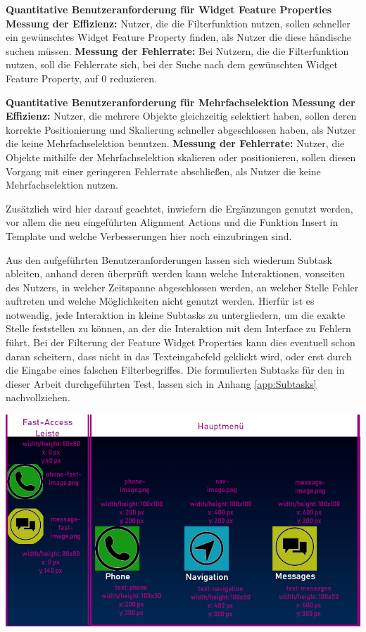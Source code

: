 \textbf{Quantitative Benutzeranforderung für Widget Feature Properties} \newline
\textbf{Messung der Effizienz:}
Nutzer, die die Filterfunktion nutzen, sollen schneller ein gewünschtes Widget Feature Property finden, als Nutzer die diese händische suchen müssen. \newline
\textbf{Messung der Fehlerrate:}
Bei Nutzern, die die Filterfunktion nutzen, soll die Fehlerrate sich, bei der Suche nach dem gewünschten Widget Feature Property, auf 0 reduzieren.

\textbf{Quantitative Benutzeranforderung für Mehrfachselektion}\newline
\textbf{Messung der Effizienz:}
Nutzer, die mehrere Objekte gleichzeitig selektiert haben, sollen deren korrekte Positionierung  und Skalierung schneller abgeschlossen haben, als Nutzer die keine Mehrfachselektion benutzen.\newline
\textbf{Messung der Fehlerrate:}
Nutzer, die Objekte mithilfe der Mehrfachselektion skalieren oder positionieren, sollen diesen Vorgang mit einer geringeren Fehlerrate abschließen, als Nutzer die keine Mehrfachselektion nutzen.

Zusätzlich wird hier darauf geachtet, inwiefern die Ergänzungen genutzt werden, vor allem die neu eingeführten \glqq Alignment Actions\grqq{} und die Funktion \glqq Insert in Template\grqq{} und welche Verbesserungen hier noch einzubringen sind.

Aus den aufgeführten Benutzeranforderungen lassen sich wiederum Subtask ableiten, anhand deren überprüft werden kann welche Interaktionen, vonseiten des Nutzers, in welcher Zeitspanne abgeschlossen werden, an welcher Stelle Fehler auftreten und welche Möglichkeiten nicht genutzt werden.
Hierfür ist es notwendig, jede Interaktion in kleine Subtasks zu untergliedern, um die exakte Stelle feststellen zu können, an der die Interaktion mit dem Interface zu Fehlern führt.
Bei der Filterung der Feature Widget Properties kann dies eventuell schon daran scheitern, dass nicht in das Texteingabefeld geklickt wird, oder erst durch die Eingabe eines falschen Filterbegriffes.
Die formulierten Subtasks für den in dieser Arbeit durchgeführten Test, lassen sich in Anhang \ref{app:Subtasks} nachvollziehen.

\begin{center}
  \includegraphics[width=\textwidth]{figures/Styleguide_Rahmen.png}
  \label{fig:Styleguide}
\end{center}

